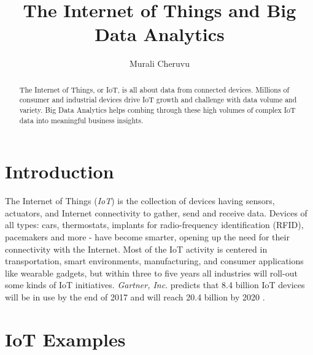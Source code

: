 \documentclass[sigconf]{acmart}
\begin{document}
	\title{The Internet of Things and Big Data Analytics}
	
	
	\author{Murali Cheruvu}
	
	\renewcommand{\shortauthors}{M. Cheruvu}
	
	
	\begin{abstract}
		
		The Internet of Things, or IoT, is all about data from connected devices. Millions of consumer and industrial devices drive IoT growth and challenge with data volume and variety. Big Data Analytics helps combing through these high volumes of complex IoT data into meaningful business insights.
		
	\end{abstract}
	
	
	\maketitle
	

	
	\section{Introduction}	
	
	The Internet of Things ({\em IoT}) is the collection of devices having sensors, actuators, and Internet connectivity to gather, send and receive data. Devices of all types: cars, thermostats, implants for radio-frequency identification (RFID), pacemakers and more - have become smarter, opening up the need for their connectivity with the Internet. Most of the IoT activity is centered in transportation, smart environments, manufacturing, and consumer applications like wearable gadgets, but within three to five years all industries will roll-out some kinds of IoT initiatives. {\em Gartner, Inc}. predicts that 8.4 billion IoT devices will be in use by the end of 2017 and will reach 20.4 billion by 2020 \cite{gartner}. 
	
	\section{IoT Examples}
	
\end{document}
